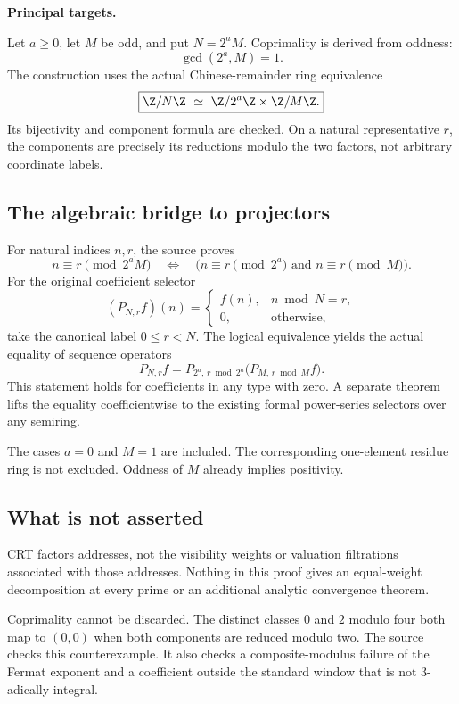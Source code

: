\textbf{Principal targets.}\par
{}\par
{}
\par\medskip
{}
Let $a\geq0$, let $M$ be odd, and put $N=2^aM$. Coprimality is derived from oddness:
\[
 \gcd(2^a,M)=1.
\]
The construction uses the actual Chinese-remainder ring equivalence
\[
 \boxed{\Z/N\Z\ \simeq\ \Z/2^a\Z\times\Z/M\Z.}
\]
Its bijectivity and component formula are checked. On a natural representative $r$, the components are precisely its reductions modulo the two factors, not arbitrary coordinate labels.

\subsection*{The algebraic bridge to projectors}
For natural indices $n,r$, the source proves
\[
 n\equiv r\pmod{2^aM}
 \quad\Longleftrightarrow\quad
 \bigl(n\equiv r\pmod{2^a}\text{ and }n\equiv r\pmod M\bigr).
\]
For the original coefficient selector
\[
 (P_{N,r}f)(n)=
 \begin{cases}f(n),&n\bmod N=r,\\0,&\text{otherwise},\end{cases}
\]
take the canonical label $0\leq r<N$. The logical equivalence yields the actual equality of sequence operators
\[
 \boxed{P_{N,r}f=
 P_{2^a,\,r\bmod2^a}\bigl(P_{M,\,r\bmod M}f\bigr).}
\]
This statement holds for coefficients in any type with zero. A separate theorem lifts the equality coefficientwise to the existing formal power-series selectors over any semiring.

The cases $a=0$ and $M=1$ are included. The corresponding one-element residue ring is not excluded. Oddness of $M$ already implies positivity.

\subsection*{What is not asserted}
CRT factors addresses, not the visibility weights or valuation filtrations associated with those addresses. Nothing in this proof gives an equal-weight decomposition at every prime or an additional analytic convergence theorem.

Coprimality cannot be discarded. The distinct classes $0$ and $2$ modulo four both map to $(0,0)$ when both components are reduced modulo two. The source checks this counterexample. It also checks a composite-modulus failure of the Fermat exponent and a coefficient outside the standard window that is not $3$-adically integral.

